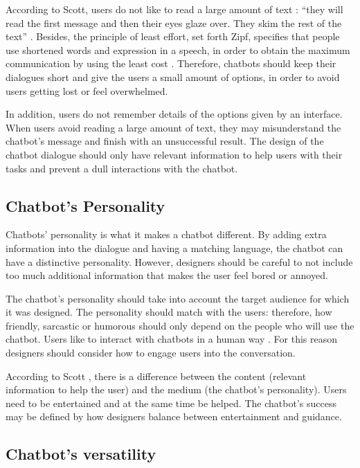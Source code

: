 \documentclass[a4paper,10pt]{article}
\begin{document}
According to Scott, users do not like to read a large amount of text : ``they will read the first message and then their eyes glaze over. They skim the rest of the text” \cite{HeuristicsWebPage}. Besides, the principle of least effort, set forth Zipf, specifies that people use shortened words and expression in a speech, in order to obtain the maximum communication by using the least cost \cite{allen1978conversation}. Therefore, chatbots should keep their dialogues short and give the users a small amount of options, in order to avoid users getting lost or feel overwhelmed.

In addition, users do not remember details of the options given by an interface. When users avoid reading a large amount of text, they may misunderstand the chatbot’s message and finish with an unsuccessful result. The design of the chatbot dialogue should only have relevant information to help users with their tasks and prevent a dull interactions with the chatbot. 

\subsection*{Chatbot's Personality}

Chatbots’ personality is what it makes a chatbot different. By adding extra information into the dialogue and having a matching language, the chatbot can have a distinctive personality. However, designers should be careful to not include too much additional information that makes the user feel bored or annoyed. 

The chatbot’s personality should take into account the target audience for which it was designed. The personality should match with the users: therefore, how friendly, sarcastic or humorous should only depend on the people who will use the chatbot. Users like to interact with chatbots in a human way \cite{HeuristicsWebPage}. For this reason designers should consider how to engage users into the conversation. 

According to Scott \cite{HeuristicsWebPage}, there is a difference between the content (relevant information to help the user) and the medium (the chatbot’s personality). Users need to be entertained and at the same time be helped. The chatbot’s success may be defined by how designers balance between entertainment and guidance.

\subsection*{Chatbot's versatility}
\end{document}

